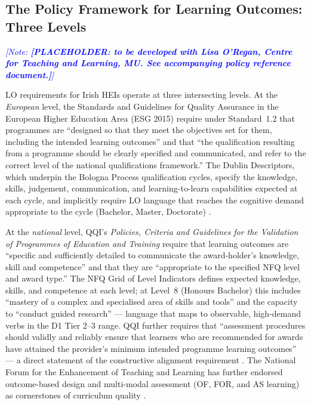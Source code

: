 \documentclass[12pt, a4paper]{article}
\newcommand{\note}[1]{\textcolor{blue}{\textit{[Note: #1]}}}
\begin{document}
\subsection{The Policy Framework for Learning Outcomes: Three Levels}
\label{sec:policyframework}

\note{\textbf{[PLACEHOLDER: to be developed with Lisa O'Regan, Centre for Teaching
and Learning, MU. See accompanying policy reference document.]}}

LO requirements for Irish HEIs operate at three intersecting levels. At the
\textit{European} level, the Standards and Guidelines for Quality Assurance in the
European Higher Education Area (ESG 2015) \citep{enqa2015esg} require under
Standard~1.2 that programmes are \enquote{designed so that they meet the objectives
set for them, including the intended learning outcomes} and that \enquote{the
qualification resulting from a programme should be clearly specified and communicated,
and refer to the correct level of the national qualifications framework.} The Dublin
Descriptors, which underpin the Bologna Process qualification cycles, specify the
knowledge, skills, judgement, communication, and learning-to-learn capabilities
expected at each cycle, and implicitly require LO language that reaches the cognitive
demand appropriate to the cycle (Bachelor, Master, Doctorate) \citep{joint2004dublin}.

At the \textit{national} level, QQI's \textit{Policies, Criteria and Guidelines for
the Validation of Programmes of Education and Training} \citep{qqi2021policies} require
that learning outcomes are \enquote{specific and sufficiently detailed to communicate
the award-holder's knowledge, skill and competence} and that they are \enquote{appropriate
to the specified NFQ level and award type.} The NFQ Grid of Level Indicators defines
expected knowledge, skills, and competence at each level; at Level~8 (Honours
Bachelor) this includes \enquote{mastery of a complex and specialised area of skills
and tools} and the capacity to \enquote{conduct guided research} --- language that
maps to observable, high-demand verbs in the D1 Tier 2--3 range. QQI further requires
that \enquote{assessment procedures should validly and reliably ensure that learners
who are recommended for awards have attained the provider's minimum intended programme
learning outcomes} --- a direct statement of the constructive alignment requirement
\citep{qqi2021policies}. The National Forum for the Enhancement of Teaching and
Learning has further endorsed outcome-based design and multi-modal assessment (OF,
FOR, and AS learning) as cornerstones of curriculum quality
\citep{nationalforum2016mapping}.
\end{document}
